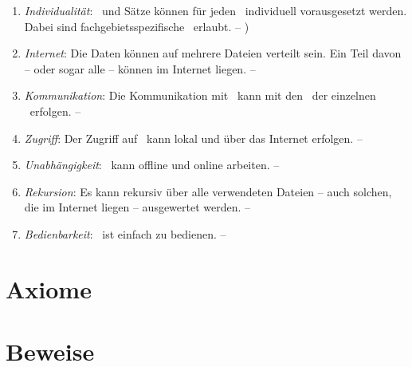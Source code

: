 \begin{enumerate}
	\item \label{Anforderung:Individualität} \emph{Individualität}:
	\Axiome\ und Sätze können für jeden \Beweis\ individuell vorausgesetzt werden.
	Dabei sind fachgebietsspezifische \Fachbegriffe\ erlaubt.
	-- )

	\item \label{Anforderung:Internet} \emph{Internet}:
	Die Daten können auf mehrere Dateien verteilt sein.
	Ein Teil davon -- oder sogar alle -- können im Internet liegen.
	-- 

	\item \label{Anforderung:Kommunikation} \emph{Kommunikation}:
	Die Kommunikation mit \ASBA\ kann mit den \Fachbegriffen\ der einzelnen \Fachgebiete\ erfolgen.
	-- 

	\item \label{Anforderung:Zugriff} \emph{Zugriff}:
	Der Zugriff auf \ASBA\ kann lokal und über das Internet erfolgen.
	-- 

	\item \label{Anforderung:Unabhängigkeit} \emph{Unabhängigkeit}:
	\ASBA\ kann offline und online arbeiten.
	-- 

	\item \label{Anforderung:Rekursion} \emph{Rekursion}:
	Es kann rekursiv über alle verwendeten Dateien -- auch solchen, die im Internet liegen -- ausgewertet werden.
	-- 

	\item \label{Anforderung:Bedienbarkeit} \emph{Bedienbarkeit}:
	\ASBA\ ist einfach zu bedienen.
	-- 

\end{enumerate}

\section{Axiome}%
\beginsection{\Axiome}
\label{sec:Axiome}

\section{Beweise}%
\beginsection{\Beweise}
\label{sec:Beweise}

